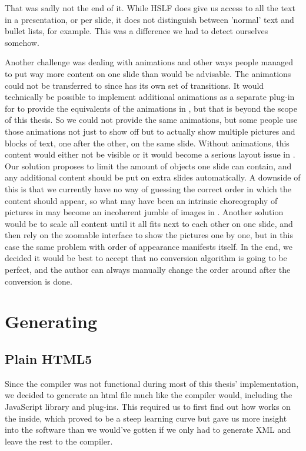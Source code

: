    That was sadly not the end of it. While HSLF does give us access to all the
   text in a presentation, or per slide, it does not distinguish between
   'normal' text and bullet lists, for example. This was a difference we had to
   detect ourselves somehow. %

   Another challenge was dealing with animations and other ways people managed
   to put way more content on one slide than would be advisable. The animations
   could not be transferred to \mxp since \mxp has its own set of transitions.
   It would technically be possible to implement additional animations as a
   separate plug-in for \mxp to provide the equivalents of the animations in
   \ppt*, but that is beyond the scope of this thesis. So we could not provide
   the same animations, but some people use those animations not just to show
   off but to actually show multiple pictures and blocks of text, one after the
   other, on the same slide. Without animations, this content would either not
   be visible or it would become a serious layout issue in \mxp. Our solution
   proposes to limit the amount of objects one slide can contain, and any
   additional content should be put on extra slides automatically. A downside
   of this is that we currently have no way of guessing the correct order in
   which the content should appear, so what may have been an intrinsic
   choreography of pictures in \ppt may become an incoherent jumble of images
   in \mxp. Another solution would be to scale all content until it all fits
   next to each other on one slide, and then rely on the zoomable interface to
   show the pictures one by one, but in this case the same problem with order
   of appearance manifests itself. In the end, we decided it would be best to
   accept that no conversion algorithm is going to be perfect, and the author
   can always manually change the order around after the conversion is done.

  \section{Generating \mxp}


   \subsection{Plain HTML5}

    Since the \mxp compiler was not functional during most of this thesis'
    implementation, we decided to generate an html file much like the \mxp
    compiler would, including the \mxp JavaScript library and plug-ins. This
    required us to first find out how \mxp works on the inside, which proved to
    be a steep learning curve but gave us more insight into the software than
    we would've gotten if we only had to generate \mxp XML and leave the rest
    to the compiler.

